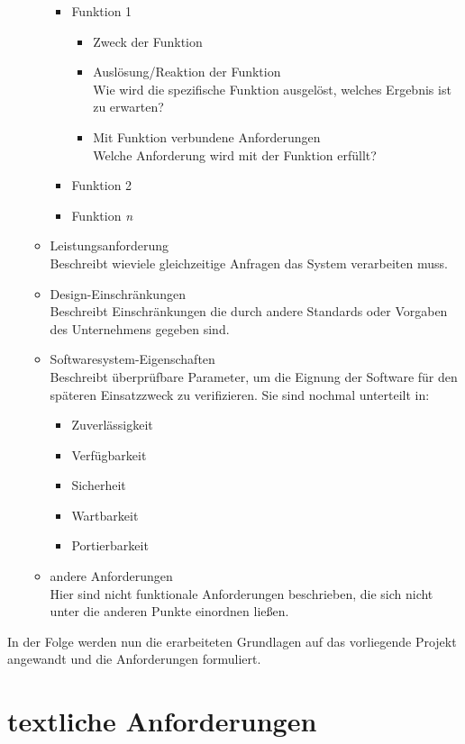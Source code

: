 \begin{itemize}
\begin{itemize}
		\begin{itemize}
			\item Funktion 1
			\begin{itemize}
				\item Zweck der Funktion
				\item Auslösung/Reaktion der Funktion \\
				Wie wird die spezifische Funktion ausgelöst, welches Ergebnis ist zu erwarten?
				\item Mit Funktion verbundene Anforderungen\\
				Welche Anforderung wird mit der Funktion erfüllt?
			\end{itemize}
			\item Funktion 2
			\item Funktion \textit{n}
		\end{itemize}
	\item Leistungsanforderung \\
	Beschreibt \zb wieviele gleichzeitige Anfragen das System verarbeiten muss.
	\item Design-Einschränkungen \\
	Beschreibt Einschränkungen die durch andere Standards oder Vorgaben des Unternehmens gegeben sind.
	\item Softwaresystem-Eigenschaften \\
	Beschreibt überprüfbare Parameter, um die Eignung der Software für den späteren Einsatzzweck zu verifizieren. Sie sind nochmal unterteilt in:
	\begin{itemize}
		\item Zuverlässigkeit 
		\item Verfügbarkeit
		\item Sicherheit
		\item Wartbarkeit
		\item Portierbarkeit
	\end{itemize} 
	\item andere Anforderungen \\
	Hier sind nicht funktionale Anforderungen beschrieben, die sich nicht unter die anderen Punkte einordnen ließen.
	\end{itemize}

\end{itemize}



In der Folge werden nun die erarbeiteten Grundlagen auf das vorliegende Projekt angewandt und die Anforderungen formuliert. 

\section{textliche Anforderungen}

